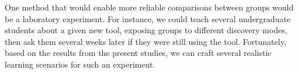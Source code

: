 \documentclass[smallextended]{svjour3}
\newcommand\discovery{peer interaction\xspace}
\newcommand\contexts{modes\xspace}
\begin{document}
One method that would enable more reliable comparisons between
groups would be a laboratory experiment.
For instance, we could teach several undergraduate
students about a given new tool, exposing groups to different 
discovery \contexts, then ask them
several weeks later if they were still using the tool.
Fortunately, based on the results from the present studies, 
we can craft several realistic learning scenarios for such an experiment.

% 
% 
% 

\end{document}
